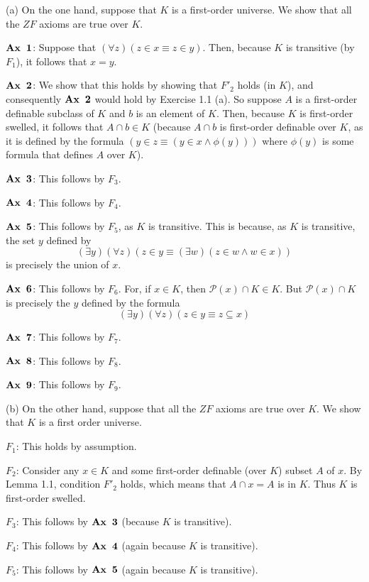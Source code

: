 \documentclass{article}
\theoremstyle{definition}
\begin{document}
(a) On the one hand, suppose that $K$ is a first-order universe. We show that all the $ZF$ axioms 
are true over $K$.
 
$\textbf{Ax\, 1}$: Suppose that $(\forall z)(z\in x\equiv z\in y)$. Then, because $K$ is transitive
(by $F_1$), it follows that $x=y$.

$\textbf{Ax\, 2}$: We show that this holds by showing that $F'_2$ holds (in $K$), and consequently 
$\textbf{Ax\, 2}$ would hold by Exercise 1.1 (a). So suppose $A$ is a first-order definable subclass of 
$K$ and $b$ is an element of $K$. Then, because $K$ is first-order swelled, it follows that 
$A\cap b\in K$ (because $A\cap b$ is first-order definable over $K$, as it is defined by the 
formula $(y\in z\equiv(y\in x\wedge\phi(y)))$ where $\phi(y)$ is some formula that defines 
$A$ over $K$).

$\textbf{Ax\, 3}$: This follows by $F_3$.

$\textbf{Ax\, 4}$: This follows by $F_4$.

$\textbf{Ax\, 5}$: This follows by $F_5$, as $K$ is transitive. This is because, as $K$ is transitive, 
the set $y$ defined by
\[ (\exists y)(\forall z)(z\in y\equiv(\exists w)(z\in w\wedge w\in x)) \] is 
precisely the union of $x$.

$\textbf{Ax\, 6}$: This follows by $F_6$. For, if $x\in K$, then 
$\mathcal{P}(x)\cap K\in K$. But $\mathcal{P}(x)\cap K$ is precisely the $y$ defined by the formula
\[ (\exists y)(\forall z)(z\in y\equiv z\subseteq x) \]

$\textbf{Ax\, 7}$: This follows by $F_7$.

$\textbf{Ax\, 8}$: This follows by $F_8$.

$\textbf{Ax\, 9}$: This follows by $F_9$.

(b) On the other hand, suppose that all the $ZF$ axioms are true over $K$. We show that 
$K$ is a first order universe.

$F_1$: This holds by assumption.

$F_2$: Consider any $x\in K$ and some first-order definable (over $K$) subset $A$ of $x$. By Lemma 1.1, 
condition $F'_2$ holds, which means that $A\cap x=A$ is in $K$. Thus $K$ is first-order swelled.

$F_3$: This follows by $\textbf{Ax\, 3}$ (because $K$ is transitive).

$F_4$: This follows by $\textbf{Ax\, 4}$ (again because $K$ is transitive).

$F_5$: This follows by $\textbf{Ax\, 5}$ (again because $K$ is transitive).
\end{document}
